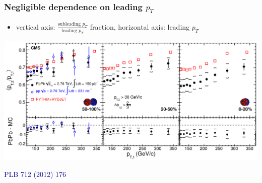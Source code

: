 \documentclass[compress]{beamer}
\begin{document}
\setcounter{page}{6}

\begin{frame}
\frametitle{Negligible dependence on leading $p_T$}

\begin{itemize}
\item vertical axis: $\displaystyle \frac{\mbox{subleading } p_T}{\mbox{leading } p_T}$ fraction, horizontal axis: leading $p_T$
\end{itemize}

\includegraphics[width=\linewidth]{dijets/quench_vs_pt.png}

\hfill \textcolor{darkblue}{\scriptsize PLB 712 (2012) 176}
\end{frame}
\end{document}

